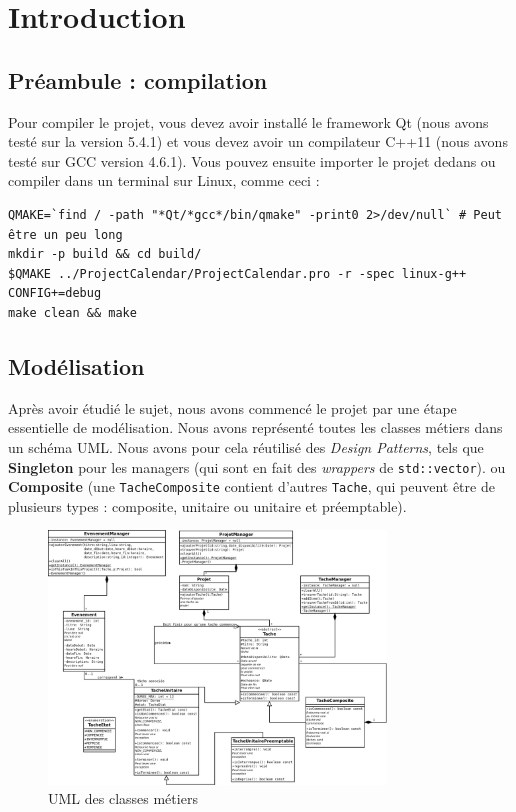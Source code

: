 \chapter{Introduction}

\section{Préambule : compilation}

Pour compiler le projet, vous devez avoir installé le framework Qt (nous avons testé sur la version 5.4.1) et vous devez avoir un compilateur C++11 (nous avons testé sur GCC version 4.6.1). Vous pouvez ensuite importer le projet dedans ou compiler dans un terminal sur Linux, comme ceci :
\begin{lstlisting}
QMAKE=`find / -path "*Qt/*gcc*/bin/qmake" -print0 2>/dev/null` # Peut être un peu long
mkdir -p build && cd build/
$QMAKE ../ProjectCalendar/ProjectCalendar.pro -r -spec linux-g++ CONFIG+=debug
make clean && make
\end{lstlisting}

\section{Modélisation}

Après avoir étudié le sujet, nous avons commencé le projet par une étape essentielle de modélisation. Nous avons représenté toutes les classes \og métiers\fg{} dans un schéma UML. Nous avons pour cela réutilisé des \textit{Design Patterns}, tels que \textbf{Singleton} pour les managers (qui sont en fait des \textit{wrappers} de \lstinline{std::vector}). ou \textbf{Composite} (une \lstinline{TacheComposite} contient d'autres \lstinline{Tache}, qui peuvent être de plusieurs types : composite, unitaire ou unitaire et préemptable).

\begin{figure}[h!]
  \centering
    \includegraphics[width=0.8\textwidth]{../modelisation/UML.png}
    \caption{UML des classes métiers}
\end{figure}

